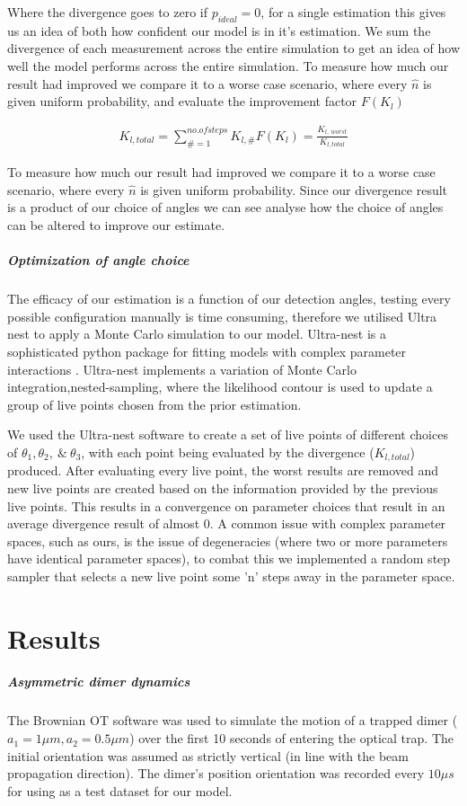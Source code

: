 \documentclass[11pt]{article}
\begin{document}
	Where the divergence goes to zero if $p_{ideal}=0$, for a single estimation this gives us an idea of both how confident our model is in it's estimation. We sum the divergence of each measurement across the entire simulation to get an idea of how well the model performs across the entire simulation. To measure how much our result had improved we compare it to a worse case scenario, where every $\hat{n}$ is given uniform probability, and evaluate the improvement factor $F(K_l)$
	
	\begin{align}
		K_{l,total} = \sum\limits_{\# =1}^{no. of steps} K_{l,\#}
		F(K_l) = \frac{K_{l,\ worst}}{K_{l,total}}
	\end{align}

	To measure how much our result had improved we compare it to a worse case scenario, where every $\hat{n}$ is given uniform probability. Since our divergence result is a product of our choice of angles we can see analyse how the choice of angles can be altered to improve our estimate.   

	\subparagraph*{Optimization of angle choice}
	The efficacy of our estimation is a function of our detection angles, testing every possible configuration manually is time consuming, therefore we utilised Ultra nest to apply a Monte Carlo simulation to our model. Ultra-nest is a sophisticated python package for fitting models with complex parameter interactions \cite{Ultranest}. Ultra-nest implements a variation of Monte Carlo integration,nested-sampling, where the likelihood contour is used to update a group of live points chosen from the prior estimation.
	
	We used the Ultra-nest software to create a set of live points of different choices of $\theta_1, \theta_2, \ \& \ \theta_3$, with each point being evaluated by the divergence ($K_{l, total}$) produced. After evaluating every live point, the worst results are removed and new live points are created based on the information provided by the previous live points. This results in a convergence on parameter choices that result in an average divergence result of almost 0. A common issue with complex parameter spaces, such as ours, is the issue of degeneracies (where two or more parameters have identical parameter spaces), to combat this we implemented a random step sampler that selects a new live point some 'n' steps away in the parameter space.
	
	\section*{Results}
	\subparagraph*{Asymmetric dimer dynamics}
	The Brownian OT software was used to simulate the motion of a trapped dimer ($a_1=1\mu m, a_2=0.5\mu m$) over the first 10 seconds of entering the optical trap. The initial orientation was assumed as strictly vertical (in line with the beam propagation direction). The dimer's position orientation was recorded every $10 \mu s$ for using as a test dataset for our model. 
	
\end{document}
